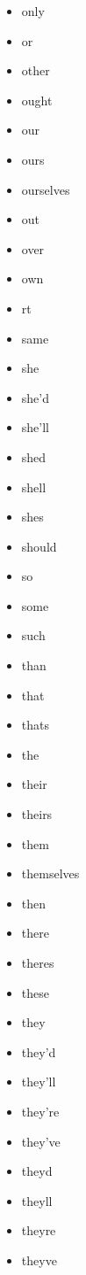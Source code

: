 \documentclass[11pt,a4paper]{report}
\begin{document}
\begin{subappendices}
{{\begin{multicols}{5}
\begin{itemize}[leftmargin=*]
        \item[] only
        \item[] or
        \item[] other
        \item[] ought
        \item[] our
        \item[] ours
        \item[] ourselves
        \item[] out
        \item[] over
        \item[] own
        \item[] rt
        \item[] same
        \item[] she
        \item[] she'd
        \item[] she'll
        \item[] shed
        \item[] shell
        \item[] shes
        \item[] should
        \item[] so
        \item[] some
        \item[] such
        \item[] than
        \item[] that
        \item[] thats
        \item[] the
        \item[] their
        \item[] theirs
        \item[] them
        \item[] themselves
        \item[] then
        \item[] there
        \item[] theres
        \item[] these
        \item[] they
        \item[] they'd
        \item[] they'll
        \item[] they're
        \item[] they've
        \item[] theyd
        \item[] theyll
        \item[] theyre
        \item[] theyve

\end{itemize}
\end{multicols}}}
\end{subappendices}
\end{document}
